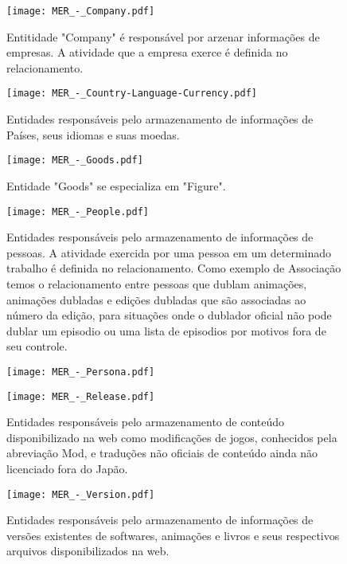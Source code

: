 \documentclass[12pt]{article}
\begin{document}
\begin{figure}[H]
\centering
\texttt{[image: MER\_-\_Company.pdf]}
\caption{Entitidade "Company" é responsável por arzenar informações de empresas. A atividade que a empresa exerce é definida no relacionamento.} \label{company}
\end{figure}

\begin{figure}[H]
\centering
\texttt{[image: MER\_-\_Country-Language-Currency.pdf]}
\caption{Entidades responsáveis pelo armazenamento de informações de Países, seus idiomas e suas moedas.} \label{hash}
\end{figure}

\begin{figure}[H]
\centering
\texttt{[image: MER\_-\_Goods.pdf]}
\caption{Entidade "Goods" se especializa em "Figure".} \label{hash}
\end{figure}

\begin{figure}[H]
\centering
\texttt{[image: MER\_-\_People.pdf]}
\caption{Entidades responsáveis pelo armazenamento de informações de pessoas. A atividade exercida por uma pessoa em um determinado trabalho é definida no relacionamento. Como exemplo de Associação temos o relacionamento entre pessoas que dublam animações, animações dubladas e edições dubladas que são associadas ao número da edição, para situações onde o dublador oficial não pode dublar um episodio ou uma lista de episodios por motivos fora de seu controle. } \label{hash}
\end{figure}

\begin{figure}[H]
\centering
\texttt{[image: MER\_-\_Persona.pdf]}
\caption{} \label{Persona}
\end{figure}




\begin{figure}[H]
\centering
\texttt{[image: MER\_-\_Release.pdf]}
\caption{Entidades responsáveis pelo armazenamento de conteúdo disponibilizado na web como modificações de jogos, conhecidos pela abreviação Mod, e traduções não oficiais de conteúdo ainda não licenciado fora do Japão.} \label{Release}
\end{figure}

\begin{figure}[H]
\centering
\texttt{[image: MER\_-\_Version.pdf]}
\caption{Entidades responsáveis pelo armazenamento de informações de versões existentes de softwares, animações e livros e seus respectivos arquivos disponibilizados na web.} \label{hash}
\end{figure}
\end{document}

